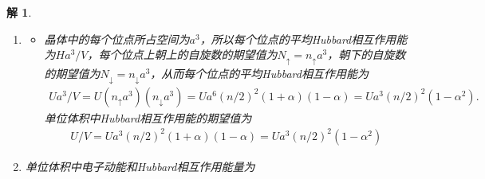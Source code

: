\documentclass[UTF8,10pt,a4paper]{article}
\theoremstyle{Problem}
\theoremstyle{Solution}
\newtheorem*{sol}{解}
\begin{document}
\begin{sol}
\begin{enumerate}
        \begin{enumerate}
            \item[$\triangleright$] 单位体积中电子的总能量为
            \begin{align}
                \nonumber E/V=&nE_{min}+C[n_{\uparrow}^{5/3}+n_{\downarrow}^{5/3}]\\
                =&nE_{min}+C(n/2)^{5/3}[(1+\alpha)^{5/3}+(1-\alpha)^{5/3}].
            \end{align}
            \item[$\triangleright$] 将上式关于$\alpha$泰勒展开并保留到四阶项
            \begin{align}
                \nonumber E/V=&E_{min}n+2C(n/2)^{5/3}[1+(1/2!)(5/3)(2/3)\alpha^2+(1/4!)(5/3)(2/3)(-1/3)(-4/3)\alpha^4]\\
                =&E_{min}n+2C(n/2)^{5/3}[1+(5/9)\alpha^2+(5/243)\alpha^4].
            \end{align}
            \item[$\triangleright$] 当$\alpha=0$，可得单位体积中电子总能量的最低可能值
            \begin{align}
                (E/V)_{min}=E_{min}n+2C(n/2)^{5/3}
            \end{align}
            \item[$\triangleright$] 上面三个步骤对于任意高阶的近似都是适用的.
        \end{enumerate}
        \item[(c)] 
        \begin{itemize}
            \item[$\triangleright$] 晶体中的每个位点所占空间为$a^3$，所以每个位点的平均Hubbard相互作用能为$Ha^3/V$，每个位点上朝上的自旋数的期望值为$N_{\uparrow}=n_{\uparrow}a^3$，朝下的自旋数的期望值为$N_{\downarrow}=n_{\downarrow}a^3$，从而每个位点的平均Hubbard相互作用能为
            \begin{align}
                Ua^3/V=U(n_{\uparrow}a^3)(n_{\downarrow}a^3)=Ua^6(n/2)^2(1+\alpha)(1-\alpha)=Ua^3(n/2)^2(1-\alpha^2).
            \end{align}
            单位体积中Hubbard相互作用能的期望值为
            \begin{align}
                U/V=Ua^3(n/2)^2(1+\alpha)(1-\alpha)=Ua^3(n/2)^2(1-\alpha^2)
            \end{align}
        \end{itemize}
        \item[(d)] 单位体积中电子动能和Hubbard相互作用能量为
        \begin{align}

\end{align}
\end{enumerate}
\end{sol}
\end{document}

